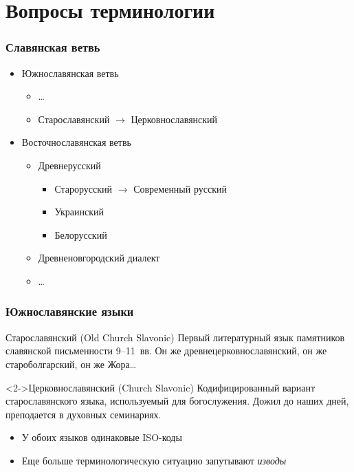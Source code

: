 % 

\frame{\titlepage}

\section{Вопросы терминологии}
\frame{\tableofcontents[currentsection]}

\begin{frame}
  \frametitle{Славянская ветвь}

  \begin{itemize}
    \item Южнославянская ветвь \begin{itemize}
      \item \ldots
      \item \alert<2->{Старославянский} $\rightarrow$ \alert<2->{Церковнославянский}
    \end{itemize}
    \item Восточнославянская ветвь \begin{itemize}
      \item \alert<2->{Древнерусский} \begin{itemize}
        \item \alert<2->{Старорусский} $\rightarrow$ Современный русский
        \item Украинский
        \item Белорусский
      \end{itemize}
      \item \alert<2->{Древненовгородский диалект}
      \item \ldots
    \end{itemize}
  \end{itemize}
\end{frame}

\begin{frame}
  \frametitle{Южнославянские языки}

  \begin{block}{Старославянский (Old Church Slavonic)}
    Первый литературный язык памятников славянской письменности 9--11~вв.
    Он же древнецерковнославянский, он же староболгарский, он же Жора\ldots
  \end{block}

  \begin{block}<2->{Церковнославянский (Church Slavonic)}
    Кодифицированный вариант старославянского языка, используемый для богослужения.
    Дожил до наших дней, преподается в духовных семинариях.
  \end{block}

  \vfill

  \begin{itemize}
    \item<3-> У обоих языков одинаковые ISO-коды
    \item<3-> Еще больше терминологическую ситуацию запутывают \textit{изводы}
  \end{itemize}
\end{frame}

